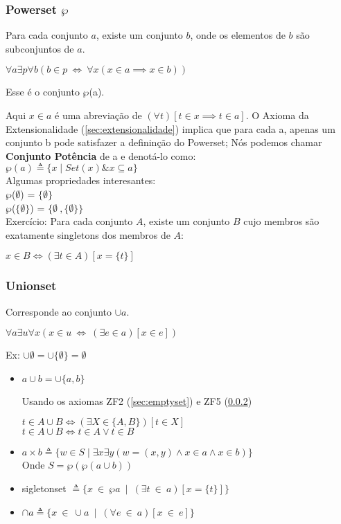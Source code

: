 \documentclass[12pt, a4paper]{article}
\begin{document}
\subsubsection{Powerset $\wp$}
Para cada conjunto $a$, existe um conjunto $b$, onde os elementos de $b$ são subconjuntos de $a$.
\begin{center}
$\forall a \exists p \forall b ( b \in p ~ \iff ~ \forall x (x \in a \implies x \in b))$
\end{center}

Esse é o conjunto $\wp$(a).

Aqui $x \in a$ é uma abreviação de $(\forall t)[t \in x \implies t \in a]$. O Axioma da Extensionalidade (\ref{sec:extensionalidade}) implica que para cada a, apenas um conjunto b pode satisfazer a defininção do Powerset; Nós podemos chamar \textbf{Conjunto Potência} de a e denotá-lo como:\\
$\wp(a) \triangleq \{x \mid Set(x) \& x \subseteq a \}$\\

Algumas propriedades interesantes:\\
$\wp$($\emptyset$) = $\{ \emptyset \}$ \\
$\wp$($\{ \emptyset \} $) = $\{ \emptyset \ , \{ \emptyset \}\}$\\

Exercício: Para cada conjunto $A$, existe um conjunto $B$ cujo membros são exatamente singletons dos membros de $A$:
\begin{center}
$ x \in B \iff (\exists t \in A) [x = \{t\}]$
\end{center}
\subsubsection{Unionset}
\label{sec:unionset}
Corresponde ao conjunto $\cup a$.\\
\begin{center}
$\forall a \exists u \forall x ( x \in u ~\iff~ (\exists e \in a) [x \in e] )$
\end{center}

Ex: $\cup \emptyset = \cup \{ \emptyset \} = \emptyset$

\begin{itemize}
\item $a \cup b = \cup \{a,b\}$

Usando os axiomas ZF2 (\ref{sec:emptyset}) e ZF5 (\ref{sec:unionset})\\
\begin{center}
$t \in A \cup B \iff (\exists X \in \{A,B\})[t \in X]$\\
$t \in A \cup B \iff t \in A \vee t \in B$
\end{center}
\item $ a \times b \triangleq \{ w \in S \mid \exists x \exists y (w = (x,y) \land x \in a \land x \in b)\}$ \\
Onde $S = \wp(\wp(a \cup b))$
\item sigletonset $ \triangleq \{ x ~ \in ~ \wp a ~\mid~ (\exists t ~\in~ a)[x = \{t\}]\}$
\item $\cap a \triangleq \{x ~\in~ \cup a ~\mid~ (\forall e ~\in~ a)[x ~\in~ e]\}$
\end{itemize}
\end{document}

